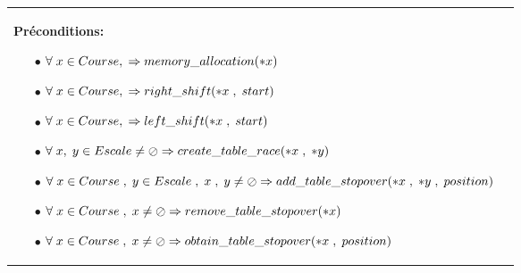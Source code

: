 \documentclass[a4paper, 11pt, oneside]{article}
\begin{document}
\begin{tabular}{|p{17cm}|c}
				\textbf{Préconditions:}
					\begin{itemize}
						\item[$\bullet$] $\forall \hspace{1mm} x \in Course, \hspace{1mm}  \Rightarrow memory\_allocation(*x)$
						\item[$\bullet$] $\forall \hspace{1mm} x \in Course, \hspace{1mm}  \Rightarrow right\_shift(*x\hspace{1mm} , \hspace{1mm} start)$
						\item[$\bullet$] $\forall \hspace{1mm} x \in Course, \hspace{1mm}  \Rightarrow left\_shift(*x\hspace{1mm} , \hspace{1mm} start)$
						\item[$\bullet$] $\forall \hspace{1mm} x, \hspace{1mm} y \in Escale \neq \oslash \Rightarrow create\_table\_race(*x \hspace{1mm} , \hspace{1mm} *y)$
						\item[$\bullet$] $\forall \hspace{1mm} x \in Course \hspace{1mm}, \hspace{1mm} y \in Escale \hspace{1mm}, \hspace{1mm} x \hspace{1mm},\hspace{1mm}y \neq \oslash \Rightarrow add\_table\_stopover(*x \hspace{1mm} , \hspace{1mm} *y \hspace{1mm} , \hspace{1mm} position)$
						\item[$\bullet$] $\forall \hspace{1mm} x \in Course \hspace{1mm} , \hspace{1mm} x \neq \oslash \Rightarrow remove\_table\_stopover(*x)$
						\item[$\bullet$] $\forall \hspace{1mm} x \in Course \hspace{1mm} , \hspace{1mm} x \neq \oslash \Rightarrow obtain\_table\_stopover(*x \hspace{1mm} , \hspace{1mm} position)$

\end{itemize}
\end{tabular}
\end{document}

